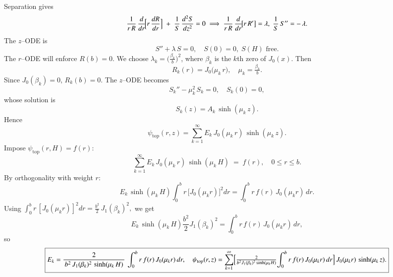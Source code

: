 \documentclass{report}
\begin{document}
\begin{center}

\end{center}

Separation gives
\[
\frac{1}{r\,R}\,\frac{d}{dr}\!\Bigl[r\,\frac{dR}{dr}\Bigr]
\;+\;
\frac{1}{S}\,\frac{d^{2}S}{dz^{2}}
= 0
\;\Longrightarrow\;
\frac{1}{r\,R}\,\frac{d}{dr}\!\bigl[r\,R'\bigr] = \lambda,\;
\frac{1}{S}\,S'' = -\,\lambda.
\]
The \(z\)–ODE is 
\[
S'' + \lambda\,S = 0,\quad S(0)=0,\;S(H)\text{ free}.
\]
The \(r\)–ODE will enforce \(R(b)=0\).  We choose \(\lambda_{k} = \bigl(\tfrac{\beta_{k}}{b}\bigr)^{2}\), where \(\beta_{k}\) is the \(k\)th zero of \(J_{0}(x)\).  Then
\[
R_{k}(r) = J_{0}\!\bigl(\mu_{k}\,r\bigr), \quad \mu_{k} = \tfrac{\beta_{k}}{b}.
\]
Since \(J_{0}(\beta_{k})=0\), \(R_{k}(b)=0\).  The \(z\)–ODE becomes
\[
S_{k}'' - \mu_{k}^{2}\,S_{k} = 0,\quad S_{k}(0)=0,
\]
whose solution is
\[
S_{k}(z) = A_{k}\,\sinh(\mu_{k}\,z).
\]
Hence
\[
\psi_{\text{top}}(r,z)
= \sum_{k=1}^{\infty}
E_{k}\,J_{0}(\mu_{k}\,r)\,\sinh(\mu_{k}\,z).
\]
Impose \(\psi_{\text{top}}(r,H) = f(r)\):
\[
\sum_{k=1}^{\infty}
E_{k}\,J_{0}(\mu_{k}\,r)\,\sinh(\mu_{k}\,H)
\;=\; f(r),\quad 0 \le r \le b.
\]
By orthogonality with weight \(r\):
\[
E_{k}\,\sinh(\mu_{k}\,H)\int_{0}^{b} r\,\bigl[J_{0}(\mu_{k}r)\bigr]^{2}dr
= \int_{0}^{b} r\,f(r)\,J_{0}(\mu_{k}r)\,dr.
\]
Using 
\(\displaystyle \int_{0}^{b} r\,[J_{0}(\mu_{k}r)]^{2}dr 
= \frac{b^{2}}{2}\,J_{1}(\beta_{k})^{2},\)
we get
\[
E_{k}\,\sinh(\mu_{k}\,H)\frac{b^{2}}{2}J_{1}(\beta_{k})^{2}
= \int_{0}^{b} r\,f(r)\,J_{0}(\mu_{k}r)\,dr,
\]
so
\[
\boxed{%
E_{k}
=
\frac{2}
     {\,b^{2}\,J_{1}(\beta_{k})^{2}\,\sinh(\mu_{k}\,H)\,}\,
\int_{0}^{b} r\,f(r)\,J_{0}(\mu_{k}r)\,dr,
\quad
\psi_{\text{top}}(r,z)
= \sum_{k=1}^{\infty}
\Bigl[\tfrac{2}{b^{2}J_{1}(\beta_{k})^{2}\sinh(\mu_{k}H)}
\!\int_{0}^{b} r\,f(r)\,J_{0}(\mu_{k}r)\,dr\Bigr]\,
J_{0}(\mu_{k}r)\,\sinh(\mu_{k}\,z).
}
\]
\end{document}
